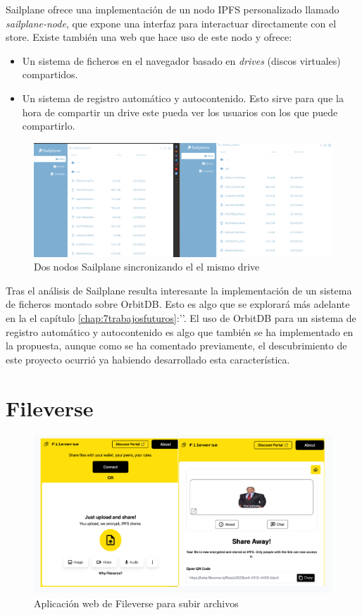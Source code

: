 Sailplane ofrece una implementación de un nodo IPFS personalizado llamado
\\\textit{sailplane-node}\cite{Sailplanenode2023}, que expone una interfaz para interactuar directamente con el store.
Existe también una web que hace uso de este nodo y ofrece:
\begin{itemize}
    \item Un sistema de ficheros en el navegador basado en \textit{drives} (discos virtuales) compartidos.
    \item Un sistema de registro automático y autocontenido. Esto sirve para que la hora de compartir un drive este pueda
          ver los usuarios con los que puede compartirlo.
\end{itemize}

\begin{figure}[H]
    \centering
    \small
    \includegraphics[width=\linewidth]{images/saiplanesynced.png}
    \caption{Dos nodos Sailplane sincronizando el el mismo drive}
    \label{fig:sailplanewebsync}
\end{figure}

Tras el análisis de Sailplane resulta interesante la implementación de un sistema de ficheros montado sobre OrbitDB.
Esto es algo que se explorará más adelante en la el capítulo \ref{chap:7trabajosfuturos}:''.
El uso de OrbitDB para un sistema de registro automático y autocontenido es algo que también se ha implementado en la propuesta, aunque como se ha
comentado previamente, el descubrimiento de este proyecto ocurrió ya habiendo desarrollado esta característica.

\section{Fileverse}


\begin{figure}[H]
    \centering
    \small
    \includegraphics[width=\linewidth]{images/fileverse.png}
    \caption{Aplicación web de Fileverse para subir archivos}
    \label{fig:fileverse}
\end{figure}

